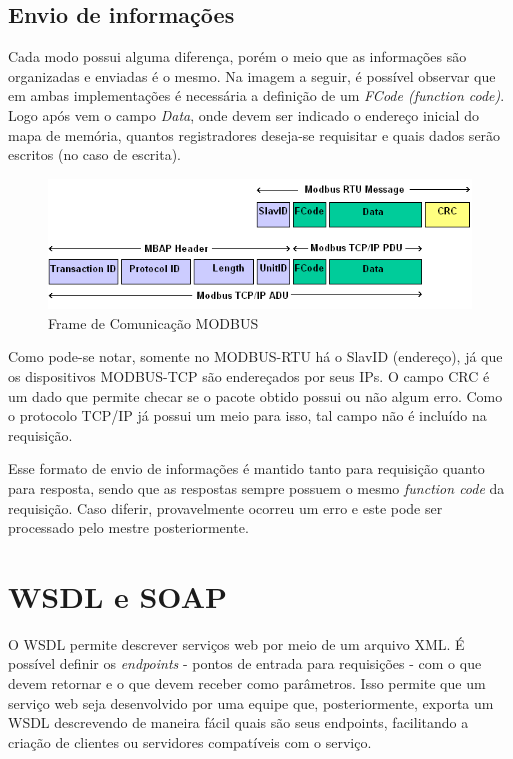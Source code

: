 \subsection{Envio de informações}

Cada modo possui alguma diferença, porém o meio que as informações são organizadas e enviadas é o mesmo. Na imagem a seguir, é possível observar que em ambas implementações é necessária a definição de um \textit{FCode (function code)}. Logo após vem o campo \textit{Data}, onde devem ser indicado o endereço inicial do mapa de memória, quantos registradores deseja-se requisitar e quais dados serão escritos (no caso de escrita).

\begin{figure}[H]
        \begin{center}
                \includegraphics[width=\textwidth,natwidth=585,natheight=180]{assets/images/modbus-frame.png}
                \caption{Frame de Comunicação MODBUS}
                \label{fig:modbus-frame}
        \end{center}
\end{figure}

Como pode-se notar, somente no MODBUS-RTU há o SlavID (endereço), já que os dispositivos MODBUS-TCP são endereçados por seus IPs. O campo CRC é um dado que permite checar se o pacote obtido possui ou não algum erro. Como o protocolo TCP/IP já possui um meio para isso, tal campo não é incluído na requisição.

Esse formato de envio de informações é mantido tanto para requisição quanto para resposta, sendo que as respostas sempre possuem o mesmo \textit{function code} da requisição. Caso diferir, provavelmente ocorreu um erro e este pode ser processado pelo mestre posteriormente.

\section{WSDL e SOAP}

O WSDL \cite{w3c-spec-wsdl} permite descrever serviços web por meio de um arquivo \ac{XML}. É possível definir os \textit{endpoints} - pontos de entrada para requisições - com o que devem retornar e o que devem receber como parâmetros. Isso permite que um serviço web seja desenvolvido por uma equipe que, posteriormente, exporta um WSDL descrevendo de maneira fácil quais são seus endpoints, facilitando a criação de clientes ou servidores compatíveis com o serviço.


